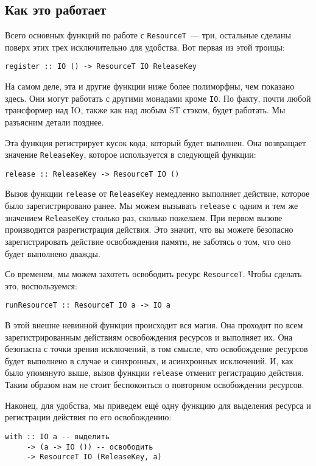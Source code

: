 \subsection{Как это работает}
Всего основных функций по работе с \lstinline'ResourceT'~--- три, остальные
сделаны поверх этих трех исключительно для удобства. Вот первая из этой троицы:
\begin{lstlisting}
register :: IO () -> ResourceT IO ReleaseKey
\end{lstlisting}

\begin{remark}
На самом деле, эта и другие функции ниже более полиморфны, чем показано здесь. Они могут работать с другими монадами кроме \verb'IO'. По факту, почти любой трансформер над
IO, также как над любым ST стэком, будет работать. Мы разъясним детали позднее.
\end{remark}

Эта функция регистрирует кусок кода, который будет выполнен. Она
возвращает значение \lstinline'ReleaseKey', которое используется в следующей функции:

\begin{lstlisting}
release :: ReleaseKey -> ResourceT IO ()
\end{lstlisting}
Вызов функции \verb=release= от \verb'ReleaseKey' немедленно выполняет действие, которое было
зарегистрировано ранее. Мы можем вызывать \verb=release= с одним и тем же значением 
\lstinline'ReleaseKey'
столько раз, сколько пожелаем. При первом вызове производится разрегистрация действия. Это
значит, что вы можете безопасно зарегистрировать действие освобождения памяти, не
заботясь о том, что оно будет выполнено дважды.

Со временем, мы можем захотеть освободить ресурс \lstinline'ResourceT'. Чтобы сделать это,
воспользуемся:
\begin{lstlisting}
runResourceT :: ResourceT IO a -> IO a
\end{lstlisting}
В этой внешне невинной функции происходит вся магия. Она проходит по всем зарегистрированным действиям освобождения ресурсов и выполняет их. 
Она безопасна с точки зрения исключений, в
том смысле, что освобождение ресурсов будет выполнено в случае и синхронных, и
асинхронных исключений. И, как было упомянуто выше, вызов функции \lstinline'release'
отменит
регистрацию действия. Таким образом нам не стоит беспокоиться о повторном освобождении
ресурсов.

Наконец, для удобства, мы приведем ещё одну функцию для выделения ресурса и регистрации
действия по его освобождению:
\begin{lstlisting}
with :: IO a -- выделить
     -> (a -> IO ()) -- освободить
     -> ResourceT IO (ReleaseKey, a)
\end{lstlisting}

